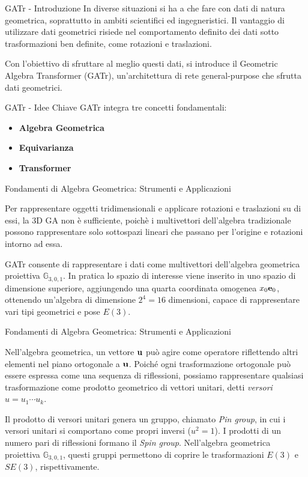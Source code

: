 \begin{frame}{GATr - Introduzione}
    In diverse situazioni si ha a che fare con dati di natura geometrica, soprattutto
    in ambiti scientifici ed ingegneristici. Il vantaggio di utilizzare dati geometrici
    risiede nel comportamento definito dei dati sotto trasformazioni ben definite, come 
    rotazioni e traslazioni.

    Con l'obiettivo di sfruttare al meglio questi dati, si introduce il 
    Geometric Algebra Transformer (GATr), un'architettura di rete general-purpose 
    che sfrutta dati geometrici. 
\end{frame}

\begin{frame}{GATr - Idee Chiave}
    GATr integra tre concetti fondamentali:
    \begin{itemize}
        \item \textbf{Algebra Geometrica}
        \item \textbf{Equivarianza}
        \item \textbf{Transformer}
    \end{itemize}
\end{frame}

\begin{frame}{Fondamenti di Algebra Geometrica: Strumenti e Applicazioni}

    Per rappresentare oggetti tridimensionali e applicare rotazioni e traslazioni su di 
    essi, la 3D GA non è sufficiente, poichè i multivettori dell'algebra tradizionale 
    possono rappresentare solo sottospazi lineari che passano per l'origine e rotazioni 
    intorno ad essa. 

    GATr consente di rappresentare i dati come multivettori dell'algebra geometrica 
    proiettiva \(\mathbb{G}_{3,0,1}\). In pratica lo spazio di interesse viene inserito 
    in uno spazio di dimensione superiore, aggiungendo una quarta coordinata omogenea 
    \(x_0 \mathbf{e}_{0}\), ottenendo un'algebra di dimensione \(2^4 = 16\) dimensioni, capace di 
    rappresentare vari tipi geometrici e pose \(E(3)\).
\end{frame}

\begin{frame}{Fondamenti di Algebra Geometrica: Strumenti e Applicazioni}

    Nell’algebra geometrica, un vettore \( \mathbf{u} \) può agire come operatore riflettendo 
    altri elementi nel piano ortogonale a \( \mathbf{u} \). 
    Poiché ogni trasformazione ortogonale può essere espressa come una sequenza di riflessioni, 
    possiamo rappresentare qualsiasi trasformazione come prodotto geometrico di vettori 
    unitari, detti \textit{versori}  \( u = u_1 \cdots u_k \).

    Il prodotto di versori unitari genera un gruppo, chiamato \textit{Pin group}, 
    in cui i versori unitari si comportano come propri inversi (\( u^2 = 1 \)). 
    I prodotti di un numero pari di riflessioni formano il \textit{Spin group}. 
    Nell’algebra geometrica proiettiva \( \mathbb{G}_{3,0,1} \), questi gruppi 
    permettono di coprire le trasformazioni \( E(3) \) e \( SE(3) \), rispettivamente.
\end{frame}

